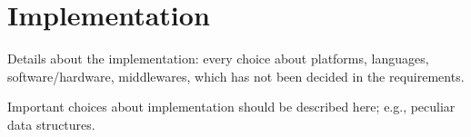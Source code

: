 \chapter{Implementation}\label{ch:implementation}

Details about the implementation: every choice about platforms, languages, software/hardware, middlewares, which has not been decided in the requirements.


Important choices about implementation should be described here; e.g., peculiar data structures.
